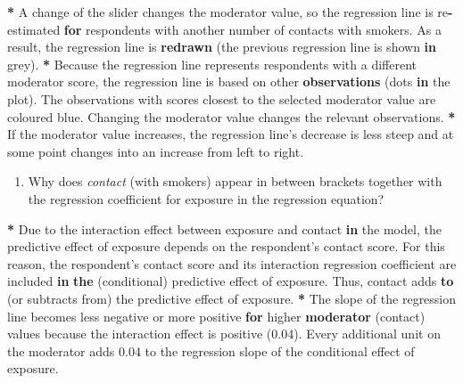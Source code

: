 \documentclass[a4paper]{book}
\newenvironment{Shaded}{\begin{snugshade}}{\end{snugshade}}
\newcommand{\KeywordTok}[1]{\textcolor[rgb]{0,0,0}{\textbf{#1}}}
\newcommand{\FloatTok}[1]{\textcolor[rgb]{0.00,0.00,0.00}{#1}}
\newcommand{\StringTok}[1]{\textcolor[rgb]{0.00,0.00,0.00}{#1}}
\newcommand{\ControlFlowTok}[1]{\textcolor[rgb]{0.00,0.00,0.00}{\textbf{#1}}}
\newcommand{\OperatorTok}[1]{\textcolor[rgb]{0.00,0.00,0.00}{\textbf{#1}}}
\newcommand{\NormalTok}[1]{#1}
\providecommand{\tightlist}{%
  \setlength{\itemsep}{0pt}\setlength{\parskip}{0pt}}
\theoremstyle{definition}
\theoremstyle{definition}
\theoremstyle{definition}
\theoremstyle{remark}
\begin{document}
\begin{Shaded}
\begin{Highlighting}[]
\OperatorTok{*}\StringTok{ }\NormalTok{A change of the slider changes the moderator value, so the regression line}
\NormalTok{is re}\OperatorTok{-}\NormalTok{estimated }\ControlFlowTok{for}\NormalTok{ respondents with another number of contacts with smokers.}
\NormalTok{As a result, the regression line is }\KeywordTok{redrawn}\NormalTok{ (the previous regression line is}
\NormalTok{shown }\ControlFlowTok{in}\NormalTok{ grey).}
\OperatorTok{*}\StringTok{ }\NormalTok{Because the regression line represents respondents with a different}
\NormalTok{moderator score, the regression line is based on other }\KeywordTok{observations}\NormalTok{ (dots }\ControlFlowTok{in}
\NormalTok{the plot). The observations with scores closest to the selected moderator}
\NormalTok{value are coloured blue. Changing the moderator value changes the relevant}
\NormalTok{observations.}
\OperatorTok{*}\StringTok{ }\NormalTok{If the moderator value increases, the regression line}\StringTok{'s decrease is less}
\StringTok{steep and at some point changes into an increase from left to right.}
\end{Highlighting}
\end{Shaded}

\begin{enumerate}
\def\labelenumi{\arabic{enumi}.}
\setcounter{enumi}{2}
\tightlist
\item
  Why does \emph{contact} (with smokers) appear in between brackets
  together with the regression coefficient for exposure in the
  regression equation?
\end{enumerate}

\begin{Shaded}
\begin{Highlighting}[]
\OperatorTok{*}\StringTok{ }\NormalTok{Due to the interaction effect between exposure and contact }\ControlFlowTok{in}\NormalTok{ the model, the}
\NormalTok{predictive effect of exposure depends on the respondent}\StringTok{'s contact score. For}
\StringTok{this reason, the respondent'}\NormalTok{s contact score and its interaction regression}
\NormalTok{coefficient are included }\ControlFlowTok{in} \KeywordTok{the}\NormalTok{ (conditional) predictive effect of exposure.}
\NormalTok{Thus, contact adds }\KeywordTok{to}\NormalTok{ (or subtracts from) the predictive effect of exposure.}
\OperatorTok{*}\StringTok{ }\NormalTok{The slope of the regression line becomes less negative or more positive }\ControlFlowTok{for}
\NormalTok{higher }\KeywordTok{moderator}\NormalTok{ (contact) values because the interaction effect is positive}
\NormalTok{(}\FloatTok{0.04}\NormalTok{). Every additional unit on the moderator adds }\FloatTok{0.04}\NormalTok{ to the regression}
\NormalTok{slope of the conditional effect of exposure.}
\end{Highlighting}
\end{Shaded}
\end{document}
